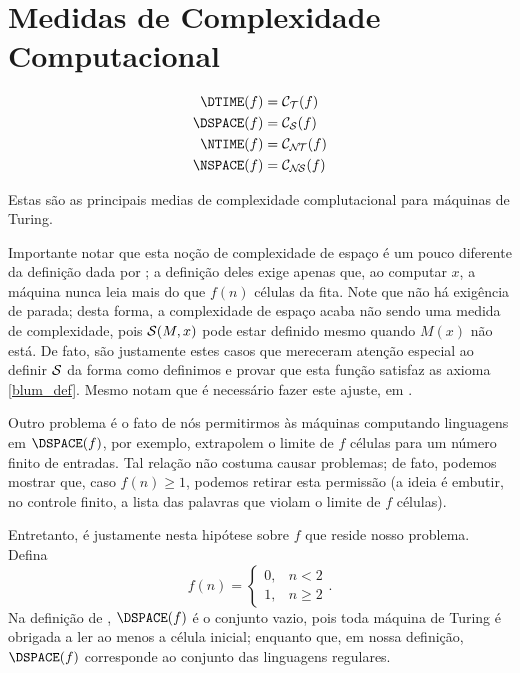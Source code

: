 \section{Medidas de Complexidade Computacional}
\label{medidas_padrao}

\begin{definition}
    \begin{align*}
        \DTIME(f) &= \mathcal C_\PhiDT(f) \\
        \DSPACE(f) &= \mathcal C_\PhiDS(f) \\
        \NTIME(f) &= \mathcal C_\PhiNT(f) \\
        \NSPACE(f) &= \mathcal C_\PhiNS(f)
    \end{align*}
\end{definition}

Estas são as principais medias de complexidade complutacional
para máquinas de Turing.

Importante notar que esta noção de complexidade de espaço
é um pouco diferente da definição dada por
;
a definição deles exige apenas que,
ao computar $x$,
a máquina nunca leia mais do que $f(n)$ células da fita.
Note que não há exigência de parada;
desta forma,
a complexidade de espaço acaba não sendo uma medida de complexidade,
pois ${\mathcal{S}}(M, x)$ pode estar definido
mesmo quando $M(x)$ não está.
De fato,
são justamente estes casos que mereceram
atenção especial ao definir ${\mathcal{S}}$
da forma como definimos
e provar que esta função satisfaz as axioma \ref{blum_def}.
Mesmo 
notam que é necessário fazer este ajuste,
em \cite[p. 313]{HopcroftUllman1979}.

Outro problema é o fato de nós permitirmos
às máquinas computando linguagens em $\DSPACE(f)$,
por exemplo,
extrapolem o limite de $f$ células
para um número finito de entradas.
Tal relação não costuma causar problemas;
de fato,
podemos mostrar que,
caso $f(n) \geq 1$,
podemos retirar esta permissão
(a ideia é embutir,
no controle finito,
a lista das palavras que violam o limite de $f$ células).

Entretanto, é justamente nesta hipótese sobre $f$
que reside nosso problema. Defina
\begin{equation*}
    f(n) = \begin{cases}
        0, & n < 2 \\
        1, & n \geq 2
    \end{cases}.
\end{equation*}
Na definição de ,
$\DSPACE(f)$ é o conjunto vazio,
pois toda máquina de Turing
é obrigada a ler ao menos a célula inicial\footnotemark;
enquanto que, em nossa definição,
$\DSPACE(f)$ corresponde ao conjunto das linguagens regulares.

